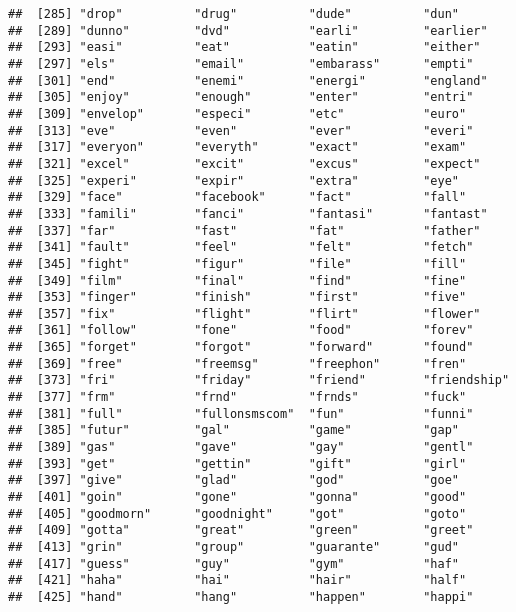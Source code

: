 \documentclass[]{article}
\begin{document}
\begin{verbatim}
##  [285] "drop"          "drug"          "dude"          "dun"          
##  [289] "dunno"         "dvd"           "earli"         "earlier"      
##  [293] "easi"          "eat"           "eatin"         "either"       
##  [297] "els"           "email"         "embarass"      "empti"        
##  [301] "end"           "enemi"         "energi"        "england"      
##  [305] "enjoy"         "enough"        "enter"         "entri"        
##  [309] "envelop"       "especi"        "etc"           "euro"         
##  [313] "eve"           "even"          "ever"          "everi"        
##  [317] "everyon"       "everyth"       "exact"         "exam"         
##  [321] "excel"         "excit"         "excus"         "expect"       
##  [325] "experi"        "expir"         "extra"         "eye"          
##  [329] "face"          "facebook"      "fact"          "fall"         
##  [333] "famili"        "fanci"         "fantasi"       "fantast"      
##  [337] "far"           "fast"          "fat"           "father"       
##  [341] "fault"         "feel"          "felt"          "fetch"        
##  [345] "fight"         "figur"         "file"          "fill"         
##  [349] "film"          "final"         "find"          "fine"         
##  [353] "finger"        "finish"        "first"         "five"         
##  [357] "fix"           "flight"        "flirt"         "flower"       
##  [361] "follow"        "fone"          "food"          "forev"        
##  [365] "forget"        "forgot"        "forward"       "found"        
##  [369] "free"          "freemsg"       "freephon"      "fren"         
##  [373] "fri"           "friday"        "friend"        "friendship"   
##  [377] "frm"           "frnd"          "frnds"         "fuck"         
##  [381] "full"          "fullonsmscom"  "fun"           "funni"        
##  [385] "futur"         "gal"           "game"          "gap"          
##  [389] "gas"           "gave"          "gay"           "gentl"        
##  [393] "get"           "gettin"        "gift"          "girl"         
##  [397] "give"          "glad"          "god"           "goe"          
##  [401] "goin"          "gone"          "gonna"         "good"         
##  [405] "goodmorn"      "goodnight"     "got"           "goto"         
##  [409] "gotta"         "great"         "green"         "greet"        
##  [413] "grin"          "group"         "guarante"      "gud"          
##  [417] "guess"         "guy"           "gym"           "haf"          
##  [421] "haha"          "hai"           "hair"          "half"         
##  [425] "hand"          "hang"          "happen"        "happi"        

\end{verbatim}
\end{document}
